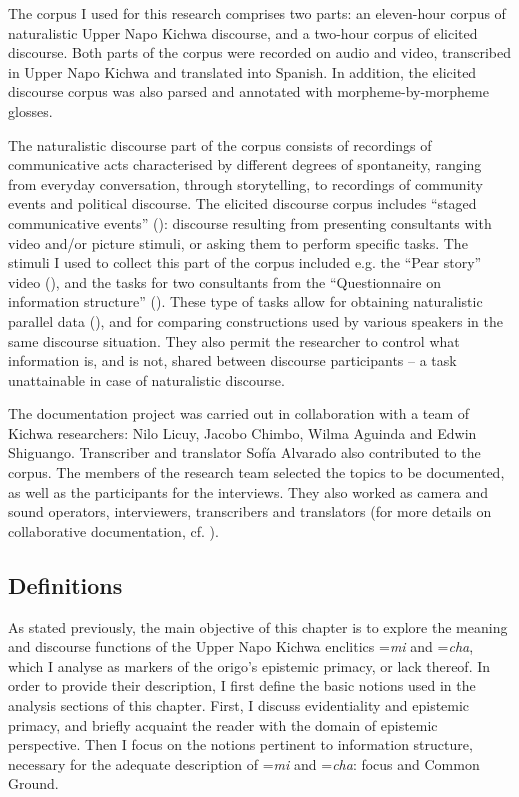 \documentclass[output=paper]{langscibook}
\begin{document}
The corpus I used for this research comprises two parts: an eleven-hour corpus of naturalistic Upper Napo Kichwa discourse, and a two-hour corpus of elicited discourse. Both parts of the corpus were recorded on audio and video, transcribed in Upper Napo Kichwa and translated into Spanish. In addition, the elicited discourse corpus was also parsed and annotated with morpheme-by-morpheme glosses. 

The naturalistic discourse part of the corpus consists of recordings of communicative acts characterised by different degrees of spontaneity, ranging from everyday conversation, through storytelling, to recordings of community events and political discourse. The elicited discourse corpus includes “staged communicative events” (\citealt{Himmelmann2006}): discourse resulting from presenting consultants with video and/or picture stimuli, or asking them to perform specific tasks. The stimuli I used to collect this part of the corpus included e.g. the “Pear story” video (\citealt{Chafe1980}), and the tasks for two consultants from the “Questionnaire on information structure” (\citealt{Skopeteas2006}). These type of tasks allow for obtaining naturalistic parallel data (\citealt[137]{SanRoque2012}), and for comparing constructions used by various speakers in the same discourse situation. They also permit the researcher to control what information is, and is not, shared between discourse participants – a task unattainable in case of naturalistic discourse.  

The documentation project was carried out in collaboration with a team of Kichwa researchers: Nilo Licuy, Jacobo Chimbo, Wilma Aguinda and Edwin Shiguango. Transcriber and translator Sofía Alvarado also contributed to the corpus. The members of the research team selected the topics to be documented, as well as the participants for the interviews. They also worked as camera and sound operators, interviewers, transcribers and translators (for more details on collaborative documentation, cf. \citealt[sec. 1.3.3]{Grzech2016a}). 


\subsection{Definitions}\label{s:kg1-3}

As stated previously, the main objective of this chapter is to explore the meaning and discourse functions of the Upper Napo Kichwa enclitics =\textit{mi} and =\textit{cha}, which I analyse as markers of the origo’s epistemic primacy, or lack thereof. In order to provide their description, I first define the basic notions used in the analysis sections of this chapter. First, I discuss evidentiality and epistemic primacy, and briefly acquaint the reader with the domain of epistemic perspective. Then I focus on the notions pertinent to information structure, necessary for the adequate description of =\textit{mi} and =\textit{cha}: focus and Common Ground.  
\end{document}

